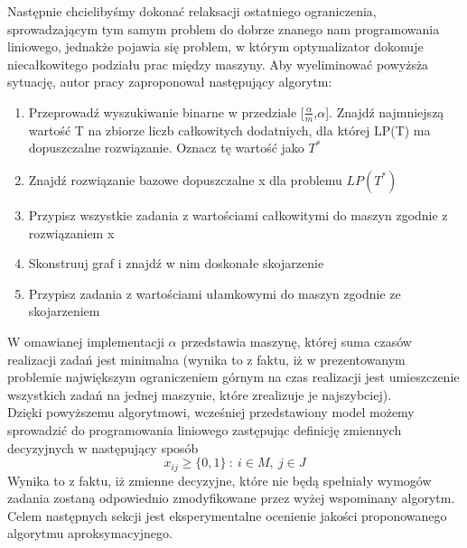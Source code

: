 \documentclass[12pt, a4paper]{report}
\begin{document}
  Następnie chcielibyśmy dokonać relaksacji ostatniego ograniczenia, sprowadzającym tym samym problem do dobrze znanego 
  nam programowania liniowego, jednakże pojawia się problem, w którym optymalizator dokonuje niecałkowitego podziału prac między maszyny. 
  Aby wyeliminować powyżsża sytuację, autor pracy \cite{Alg} zaproponował następujący algorytm:
  \begin{enumerate}
    \item Przeprowadź wyszukiwanie binarne w przedziale [$\frac{\alpha}{m}$,$\alpha$].
    Znajdź najmniejszą wartość T na zbiorze liczb całkowitych dodatniych, dla której 
    LP(T) ma dopuszczalne rozwiązanie. Oznacz tę wartość jako $T^{*}$
    \item Znajdź rozwiązanie bazowe dopuszczalne x dla problemu $LP(T^{*})$
    \item Przypisz wszystkie zadania z wartościami całkowitymi do maszyn zgodnie 
    z rozwiązaniem x
    \item Skonstruuj graf i znajdź w nim doskonałe skojarzenie
    \item Przypisz zadania z wartościami ułamkowymi do maszyn zgodnie ze skojarzeniem
  \end{enumerate}
  W omawianej implementacji $\alpha$ przedstawia maszynę, której suma czasów realizacji zadań jest minimalna (wynika to z faktu, iż 
  w prezentowanym problemie największym ograniczeniem górnym na czas realizacji jest umieszczenie wszystkich zadań na jednej maszynie, 
  które zrealizuje je najszybciej). \\
  Dzięki powyższemu algorytmowi, wcześniej przedstawiony model możemy sprowadzić do programowania 
  liniowego zastępując definicję zmiennych decyzyjnych w następujący sposób
  \begin{equation}
    x_{ij} \geq \{0,1\} \: : \: i \in M, \: j \in J
  \end{equation}
  Wynika to z faktu, iż zmienne decyzyjne, które nie będą spełniały wymogów zadania zostaną odpowiednio zmodyfikowane przez 
  wyżej wspominany algorytm. \\
  Celem następnych sekcji jest eksperymentalne ocenienie jakości proponowanego algorytmu aproksymacyjnego.
\end{document}

